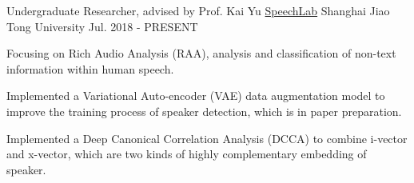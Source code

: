 \begin{cventries}
	\cventry
	{Undergraduate Researcher, advised by Prof. Kai Yu}
	{\href{https://speechlab.sjtu.edu.cn/}{SpeechLab}}
	{Shanghai Jiao Tong University}
	{Jul. 2018 - PRESENT}
	{
		\begin{cvitems}
			\item {Focusing on Rich Audio Analysis (RAA), analysis and classification of non-text information within human speech.}
            \item {Implemented a Variational Auto-encoder (VAE) data augmentation model to improve the training process of speaker detection, which is in paper preparation.}
            \item {Implemented a Deep Canonical Correlation Analysis (DCCA) to combine i-vector and x-vector, which are two kinds of highly complementary embedding of speaker.}
		\end{cvitems}
	}
\end{cventries}
